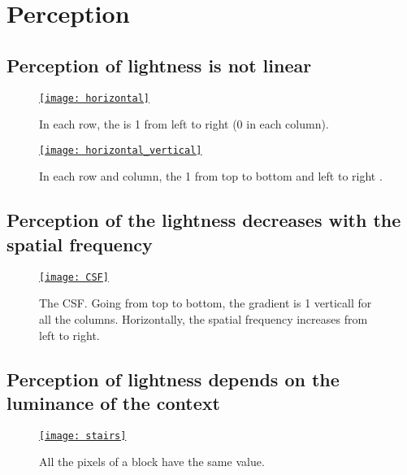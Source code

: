 \chapter{Perception}

\section{Perception of lightness \cite{wikipedia_lightness} is not linear}
\begin{figure}[H]
  \centering
  \href{https://github.com/vicente-gonzalez-ruiz/medical_imaging/blob/main/notebooks/horizontal_vertical.ipynb}{\texttt{[image: horizontal]}}
  \caption[Perception of lightness (brightness) is not linear (1).]{In each row, the  is 1 from left to right (0 in each column).}
  \label{fig:HVS_no_linear}
\end{figure}

\begin{figure}[H]
  \centering
  \href{https://github.com/vicente-gonzalez-ruiz/medical_imaging/blob/main/notebooks/horizontal_vertical.ipynb}{\texttt{[image: horizontal\_vertical]}}
  \caption[Perception of lightness is not linear (2).]{In each row and column, the  1 from top to bottom and left to right .}
  \label{fig:HVS_no_linear}
\end{figure}

\section{Perception of the lightness decreases with the spatial frequency}
\begin{figure}[H]
  \centering
  \href{https://github.com/vicente-gonzalez-ruiz/medical_imaging/blob/main/notebooks/CSF.ipynb}{\texttt{[image: CSF]}}
  \caption[Lightness VS spatial frequency (the \gls{CSF}).]{The
    \gls{CSF}. Going from top to bottom, the gradient is 1 verticall
    for all the columns. Horizontally, the spatial frequency increases
    from left to right.}
  \label{fig:CSF}
\end{figure}

\section{Perception of lightness depends on the luminance of the context}
\begin{figure}[H]
  \centering
  \href{https://github.com/vicente-gonzalez-ruiz/medical_imaging/blob/main/notebooks/stairs.ipynb}{\texttt{[image: stairs]}}
  \caption[Lightness VS surrounding luminance (1).]{All the pixels of a block have the same value.}
  \label{fig:stairs}
\end{figure}

